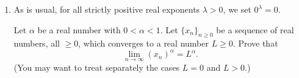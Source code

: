 \documentclass[11pt]{article}
\begin{document}
\begin{enumerate}[leftmargin=0pt, label=\arabic*)]
  \item As is usual, for all strictly positive real exponents \(\lambda > 0\), we set \(0^\lambda = 0\).

    Let \(\alpha\) be a real number with \(0 < \alpha < 1\).  Let \(\{x_n\}_{n \geq 0}\) be a sequence of 
    real numbers, all \(\geq 0\), which converges to a real number \(L \geq 0\).  Prove that 
    \[\lim_{n \to \infty} (x_n)^\alpha = L^\alpha.\]
    (You may want to treat separately the cases \(L = 0\) and \(L > 0\).)


 \end{enumerate}
\end{document}
